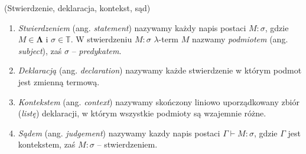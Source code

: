 \begin{definicja}(Stwierdzenie, deklaracja, kontekst, sąd)
  \begin{enumerate}[label=(\arabic*)]
  \setlength\itemsep{0em}
  \item \emph{Stwierdzeniem} (ang. \emph{statement}) nazywamy każdy napis postaci \(M:\sigma\), gdzie \(M\in\mathbf{\Lambda}\) i \(\sigma\in\mathbb{T}\). W stwierdzeniu \(M:\sigma\) \(\lambda\)-term \(M\) nazwamy \emph{podmiotem} (ang. \emph{subject}), zaś \(\sigma\) -- \emph{predykatem}.
  \item \emph{Deklaracją} (ang. \emph{declaration}) nazywamy każde stwierdzenie w którym podmot jest zmienną termową.
  \item \emph{Kontekstem} (ang. \emph{context}) nazywamy skończony liniowo uporządkowany zbiór (\emph{listę}) deklaracji, w którym wszystkie podmioty są wzajemnie różne.
  \item \emph{Sądem} (ang. \emph{judgement}) nazywamy kazdy napis postaci \(\Gamma\vdash M:\sigma\), gdzie \(\Gamma\) jest kontekstem, zaś \(M:\sigma\) -- stwierdzeniem.  
  \end{enumerate}
\end{definicja}

